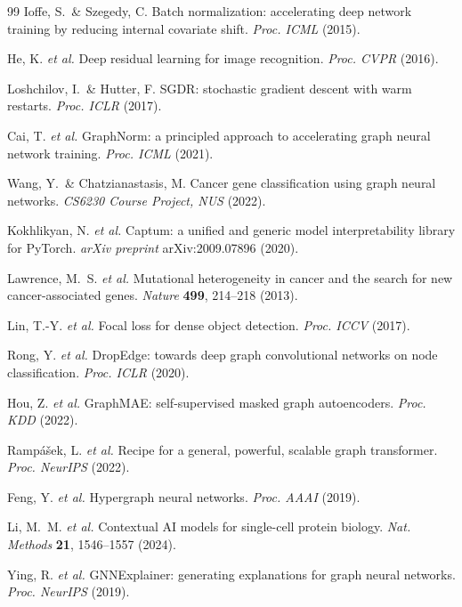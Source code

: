 \begin{thebibliography}{99}
Ioffe, S.\ \& Szegedy, C.
Batch normalization: accelerating deep network training by reducing internal
covariate shift.
\textit{Proc. ICML} (2015).

He, K. \textit{et al.}
Deep residual learning for image recognition.
\textit{Proc. CVPR} (2016).

Loshchilov, I.\ \& Hutter, F.
SGDR: stochastic gradient descent with warm restarts.
\textit{Proc. ICLR} (2017).

Cai, T. \textit{et al.}
GraphNorm: a principled approach to accelerating graph neural network training.
\textit{Proc. ICML} (2021).

Wang, Y.\ \& Chatzianastasis, M.
Cancer gene classification using graph neural networks.
\textit{CS6230 Course Project, NUS} (2022).

Kokhlikyan, N. \textit{et al.}
Captum: a unified and generic model interpretability library for PyTorch.
\textit{arXiv preprint} arXiv:2009.07896 (2020).

Lawrence, M.\ S. \textit{et al.}
Mutational heterogeneity in cancer and the search for new cancer-associated genes.
\textit{Nature} \textbf{499}, 214--218 (2013).

Lin, T.-Y. \textit{et al.}
Focal loss for dense object detection.
\textit{Proc. ICCV} (2017).

Rong, Y. \textit{et al.}
DropEdge: towards deep graph convolutional networks on node classification.
\textit{Proc. ICLR} (2020).

Hou, Z. \textit{et al.}
GraphMAE: self-supervised masked graph autoencoders.
\textit{Proc. KDD} (2022).

Ramp\'{a}\v{s}ek, L. \textit{et al.}
Recipe for a general, powerful, scalable graph transformer.
\textit{Proc. NeurIPS} (2022).

Feng, Y. \textit{et al.}
Hypergraph neural networks.
\textit{Proc. AAAI} (2019).

Li, M.\ M. \textit{et al.}
Contextual AI models for single-cell protein biology.
\textit{Nat. Methods} \textbf{21}, 1546--1557 (2024).

Ying, R. \textit{et al.}
GNNExplainer: generating explanations for graph neural networks.
\textit{Proc. NeurIPS} (2019).


\end{thebibliography}
